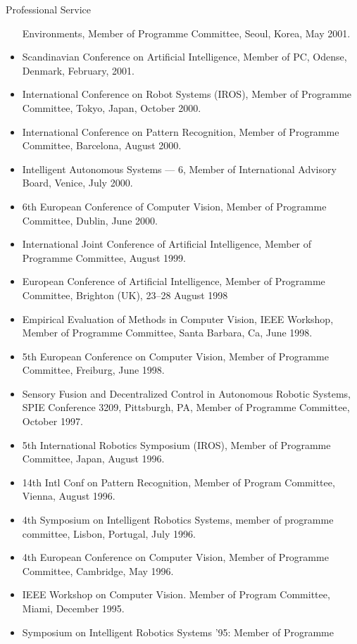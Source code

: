 \documentclass{article}
\begin{document}
\begin{cv}
\begin{cvlist}{Professional Service}
\begin{itemize}
			      Environments, Member of Programme Committee, Seoul, Korea, May 2001.
			\item Scandinavian Conference on Artificial Intelligence, Member of PC, Odense,
			      Denmark, February, 2001.
			\item International Conference on Robot Systems (IROS), Member of Programme
			      Committee, Tokyo, Japan, October 2000.
			\item International Conference on Pattern Recognition, Member of Programme
			      Committee, Barcelona, August 2000.
			\item Intelligent Autonomous Systems --- 6, Member of International Advisory
			      Board, Venice, July 2000.
			\item 6th European Conference of Computer Vision, Member of Programme Committee,
			      Dublin, June 2000.
			\item International Joint Conference of Artificial Intelligence, Member of
			      Programme Committee, August 1999.
			\item European Conference of Artificial Intelligence, Member of Programme
			      Committee, Brighton (UK), 23--28 August 1998
			\item Empirical Evaluation of Methods in Computer Vision, IEEE Workshop, Member
			      of Programme Committee, Santa Barbara, Ca, June 1998.
			\item 5th European Conference on Computer Vision, Member of Programme Committee,
			      Freiburg, June 1998.
			\item Sensory Fusion and Decentralized Control in Autonomous Robotic Systems,
			      SPIE Conference 3209, Pittsburgh, PA, Member of Programme Committee,
			      October 1997.
			\item 5th International Robotics Symposium (IROS), Member of Programme
			      Committee, Japan, August 1996.
			\item 14th Intl Conf on Pattern Recognition, Member of Program Committee,
			      Vienna, August 1996.
			\item 4th Symposium on Intelligent Robotics Systems, member of programme
			      committee, Lisbon, Portugal, July 1996.
			\item 4th European Conference on Computer Vision, Member of Programme Committee,
			      Cambridge, May 1996.
			\item IEEE Workshop on Computer Vision. Member of Program Committee, Miami,
			      December 1995.
			\item Symposium on Intelligent Robotics Systems '95: Member of Programme

\end{itemize}
\end{cvlist}
\end{cv}
\end{document}
